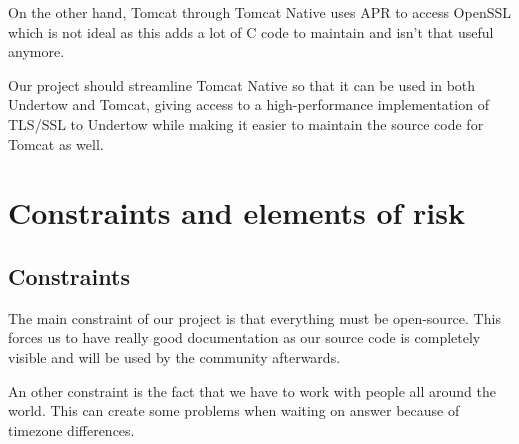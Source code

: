 \documentclass[11pt,a4paper,bibliography=totocnumbered]{scrartcl}
\begin{document}
On the other hand, Tomcat through Tomcat Native uses APR to access OpenSSL which is not ideal as this adds a lot of C code to maintain and isn't that useful anymore.

Our project should streamline Tomcat Native so that it can be used in both Undertow and Tomcat, giving access to a high-performance implementation of TLS/SSL to Undertow while making it easier to maintain the source code for  Tomcat as well.


\section{Constraints and elements of risk}

\subsection{Constraints}
\label{subsec:constraints}

The main constraint of our project is that everything must be open-source. This forces us to have really good documentation as our source code is completely visible and will be used by the community afterwards.

An other constraint is the fact that we have to work with people all around the world. This can create some problems when waiting on answer because of timezone differences.
\end{document}
